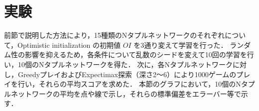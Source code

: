 \section{実験}

前節で説明した方法により，15種類のNタプルネットワークのそれぞれについて，Optimistic initialization の初期値 $\mathit{OI}$ を3通り変えて学習を行った．
ランダム性の影響を抑えるため，各条件について乱数のシードを変えて10回の学習を行い，10個のNタプルネットワークを得た．
次に，各Nタプルネットワークに対し，GreedyプレイおよびExpectimax探索（深さ2〜6）により1000ゲームのプレイを行い，それらの平均スコアを求めた．
本節のグラフにおいて，10個のNタプルネットワークの平均を点や線で示し，それらの標準偏差をエラーバー等で示す．





